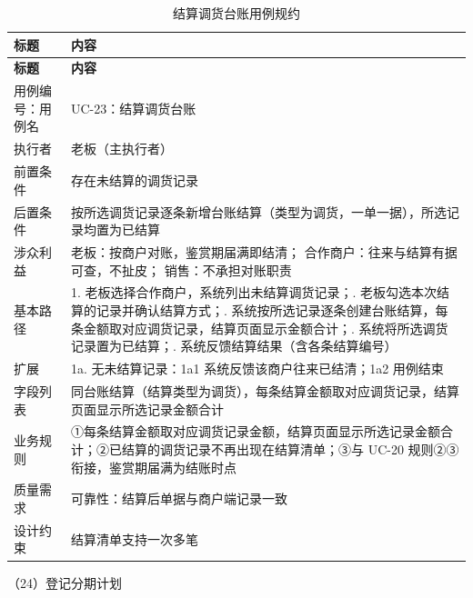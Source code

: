 {\small
\begin{longtable}{@{}L{3.0cm} L{12.3cm}@{}}
\caption{结算调货台账用例规约}\label{tab:uc-23}\\
\toprule
\textbf{标题} & \textbf{内容} \\
\midrule
\endfirsthead
\toprule
\textbf{标题} & \textbf{内容} \\
\midrule
\endhead
用例编号：用例名 & UC-23：结算调货台账 \\
\midrule
执行者 & 老板（主执行者） \\
\midrule
前置条件 & 存在未结算的调货记录 \\
\midrule
后置条件 & 按所选调货记录逐条新增台账结算（类型为调货，一单一据），所选记录均置为已结算 \\
\midrule
涉众利益 & 老板：按商户对账，鉴赏期届满即结清；\newline
合作商户：往来与结算有据可查，不扯皮；\newline
销售：不承担对账职责 \\
\midrule
基本路径 & 1. 老板选择合作商户，系统列出未结算调货记录；. 老板勾选本次结算的记录并确认结算方式；. 系统按所选记录逐条创建台账结算，每条金额取对应调货记录，结算页面显示金额合计；. 系统将所选调货记录置为已结算；. 系统反馈结算结果（含各条结算编号） \\
\midrule
扩展 & 1a. 无未结算记录：1a1 系统反馈该商户往来已结清；1a2 用例结束 \\
\midrule
字段列表 & 同台账结算（结算类型为调货），每条结算金额取对应调货记录，结算页面显示所选记录金额合计 \\
\midrule
业务规则 & ①每条结算金额取对应调货记录金额，结算页面显示所选记录金额合计；\newline ②已结算的调货记录不再出现在结算清单；\newline ③与 UC-20 规则②③衔接，鉴赏期届满为结账时点 \\
\midrule
质量需求 & 可靠性：结算后单据与商户端记录一致 \\
\midrule
设计约束 & 结算清单支持一次多笔 \\
\midrule
\bottomrule
\end{longtable}}

\noindent（24）登记分期计划


